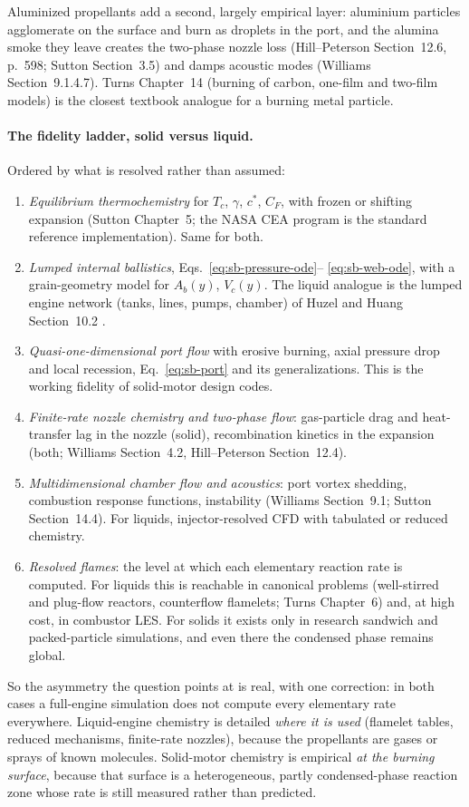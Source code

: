 Aluminized propellants add a second, largely empirical layer: aluminium
particles agglomerate on the surface and burn as droplets in the port, and the
alumina smoke they leave creates the two-phase nozzle loss (Hill--Peterson
Section~12.6, p.~598; Sutton Section~3.5) and damps acoustic modes (Williams
Section~9.1.4.7). Turns Chapter~14 (burning of carbon, one-film and two-film
models) \cite{turns} is the closest textbook analogue for a burning metal particle.

\paragraph{The fidelity ladder, solid versus liquid.}
Ordered by what is resolved rather than assumed:
\begin{enumerate}
\item \emph{Equilibrium thermochemistry} for $T_c$, $\gamma$, $c^*$,
$C_F$, with frozen or shifting expansion (Sutton Chapter~5; the NASA CEA
program \cite{CEA1994} is the standard reference implementation). Same for
both.
\item \emph{Lumped internal ballistics}, Eqs.~\eqref{eq:sb-pressure-ode}--%
\eqref{eq:sb-web-ode}, with a grain-geometry model for $A_b(y)$, $V_c(y)$.
The liquid analogue is the lumped engine network (tanks, lines, pumps,
chamber) of Huzel and Huang Section~10.2 \cite{huzelhuang}.
\item \emph{Quasi-one-dimensional port flow} with erosive burning, axial
pressure drop and local recession, Eq.~\eqref{eq:sb-port} and its
generalizations. This is the working fidelity of solid-motor design codes.
\item \emph{Finite-rate nozzle chemistry and two-phase flow}: gas-particle
drag and heat-transfer lag in the nozzle (solid), recombination kinetics
in the expansion (both; Williams Section~4.2, Hill--Peterson
Section~12.4).
\item \emph{Multidimensional chamber flow and acoustics}: port vortex
shedding, combustion response functions, instability (Williams
Section~9.1; Sutton Section~14.4). For liquids, injector-resolved CFD with
tabulated or reduced chemistry.
\item \emph{Resolved flames}: the level at which each elementary reaction
rate is computed. For liquids this is reachable in canonical problems
(well-stirred and plug-flow reactors, counterflow flamelets; Turns
Chapter~6) and, at high cost, in combustor LES. For solids it exists only in
research sandwich and packed-particle simulations, and even there the
condensed phase remains global.
\end{enumerate}
So the asymmetry the question points at is real, with one correction: in
both cases a full-engine simulation does not compute every elementary rate
everywhere. Liquid-engine chemistry is detailed \emph{where it is used}
(flamelet tables, reduced mechanisms, finite-rate nozzles), because the
propellants are gases or sprays of known molecules. Solid-motor chemistry
is empirical \emph{at the burning surface}, because that surface is a
heterogeneous, partly condensed-phase reaction zone whose rate is still
measured rather than predicted.
